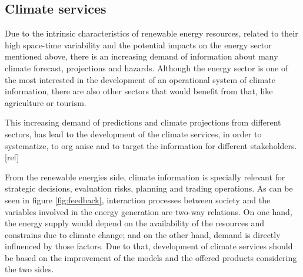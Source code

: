 

\subsection{Climate services}


Due to the intrinsic characteristics of renewable energy resources, related to their high space-time variability and the potential impacts on the energy sector mentioned above, there is an increasing demand of information about many climate forecast, projections and hazards. Although the energy sector is one of the most interested in the development of an operational system of climate information, there are also other sectors that would benefit from that, like agriculture or tourism.  
  
This increasing demand of predictions and climate projections from different sectors, has lead to the development of the  climate services, in order to systematize, to org anise and to target the information for different stakeholders. [ref]


From the renewable energies side, climate information is specially relevant for strategic decisions, evaluation risks, planning and trading operations. As can be seen in figure \ref{fig:feedback}, interaction processes between society and the variables involved in the energy generation are two-way relations. On one hand, the energy supply would depend on the availability of the resources and constrains due to climate change;  and on the other hand, demand is directly influenced by those factors. Due to that, development of climate services should be based on the improvement of the models and the offered products considering the two sides.   

